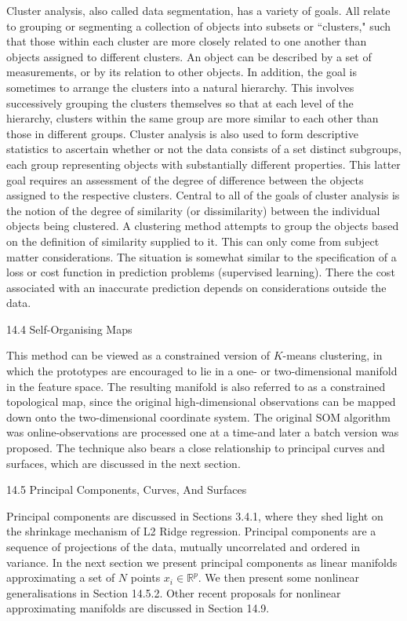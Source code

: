 Cluster analysis, also called data segmentation, has a variety of goals. All relate to grouping or segmenting a collection of objects into subsets or ``clusters," such that those within each cluster are more closely related to one another than objects assigned to different clusters. An object can be described by a set of measurements, or by its relation to other objects. In addition, the goal is sometimes to arrange the clusters into a natural hierarchy. This involves successively grouping the clusters themselves so that at each level of the hierarchy, clusters within the same group are more similar to each other than those in different groups. Cluster analysis is also used to form descriptive statistics to ascertain whether or not the data consists of a set distinct subgroups, each group representing objects with substantially different properties. This latter goal requires an assessment of the degree of difference between the objects assigned to the respective clusters. Central to all of the goals of cluster analysis is the notion of the degree of similarity (or dissimilarity) between the individual objects being clustered. A clustering method attempts to group the objects based on the definition of similarity supplied to it. This can only come from subject matter considerations. The situation is somewhat similar to the specification of a loss or cost function in prediction problems (supervised learning). There the cost associated with an inaccurate prediction depends on considerations outside the data.

14.4 Self-Organising Maps

This method can be viewed as a constrained version of $K$-means clustering, in which the prototypes are encouraged to lie in a one- or two-dimensional manifold in the feature space. The resulting manifold is also referred to as a constrained topological map, since the original high-dimensional observations can be mapped down onto the two-dimensional coordinate system. The original SOM algorithm was online-observations are processed one at a time-and later a batch version was proposed. The technique also bears a close relationship to principal curves and surfaces, which are discussed in the next section.

14.5 Principal Components, Curves, And Surfaces

Principal components are discussed in Sections 3.4.1, where they shed light on the shrinkage mechanism of L2 Ridge regression. Principal components are a sequence of projections of the data, mutually uncorrelated and ordered in variance. In the next section we present principal components as linear manifolds approximating a set of $N$ points $x_i \in \mathbb{R}^p$. We then present some nonlinear generalisations in Section 14.5.2. Other recent proposals for nonlinear approximating manifolds are discussed in Section 14.9.

